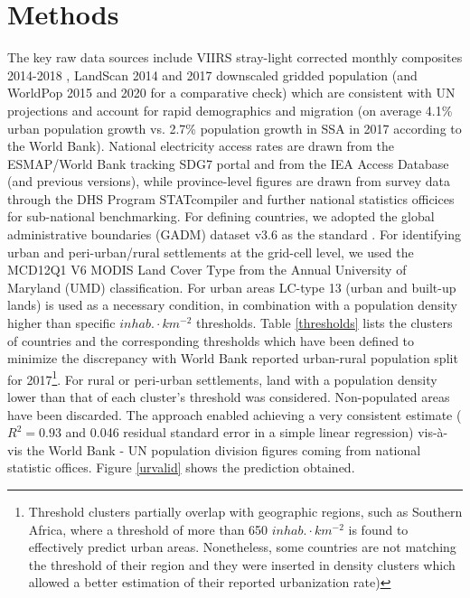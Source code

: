 \documentclass[preprint,12pt]{elsarticle}
\begin{document}
\section{Methods}
The key raw data sources include VIIRS stray-light corrected monthly composites 2014-2018 \citep{baugh2013nighttime}, LandScan 2014 and 2017 downscaled gridded population \citep{dobson2000landscan} (and WorldPop 2015 and 2020 \citep{tatem2017worldpop} for a comparative check) which are consistent with UN projections and account for rapid demographics and migration (on average 4.1\% urban population growth vs. 2.7\% population growth in SSA in 2017 according to the World Bank). National electricity access rates are drawn from the ESMAP/World Bank tracking SDG7 portal \citep{banerjee2013global} and from the IEA Access Database \citep{iea_world_2018} (and previous versions), while province-level figures are drawn from survey data through the DHS Program STATcompiler and further national statistics officices for sub-national benchmarking. For defining countries, we adopted the global administrative boundaries (GADM) dataset v3.6 as the standard \citep{hijmans2018gadm}. For identifying urban and peri-urban/rural settlements at the grid-cell level, we used the MCD12Q1 V6 MODIS Land Cover Type \citep{friedl2015mcd12q1} from the Annual University of Maryland (UMD) classification. For urban areas LC-type 13 (urban and built-up lands) is used as a necessary condition, in combination with a population density higher than specific $inhab. \cdot km^{-2}$ thresholds. Table \ref{thresholds} lists the clusters of countries and the corresponding thresholds which have been defined to minimize the discrepancy with World Bank reported urban-rural population split for 2017\footnote{Threshold clusters partially overlap with geographic regions, such as Southern Africa, where a threshold of more than 650  $inhab. \cdot km^{-2}$ is found to effectively predict urban areas. Nonetheless, some countries are not matching the threshold of their region and they were inserted in density clusters which allowed a better estimation of their reported urbanization rate)}. For rural or peri-urban settlements, land with a population density lower than that of each cluster's threshold was considered. Non-populated areas have been discarded. The approach enabled achieving a very consistent estimate ($R^2 = 0.93$ and 0.046 residual standard error in a simple linear regression) vis-à-vis the World Bank - UN population division figures coming from national statistic offices. Figure \ref{urvalid} shows the prediction obtained.  
\end{document}
